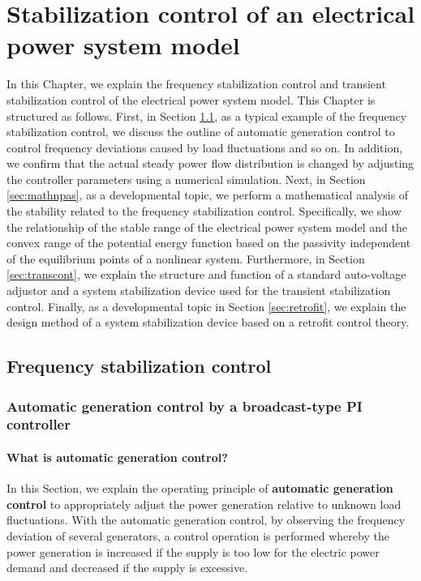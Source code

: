 \documentclass[tombow,dvipdfmx]{corona-a5-1.1}
\begin{document}
\chapter{Stabilization control of an electrical power system model}\label{ch:stabcont}

In this Chapter, we explain the frequency stabilization control and transient stabilization control of the electrical power system model.
This Chapter is structured as follows. First, in Section \ref{sec:agcover}, as a typical example of the frequency stabilization control, we discuss the outline of automatic generation control to control frequency deviations caused by load fluctuations and so on.
In addition, we confirm that the actual steady power flow distribution is changed by adjusting the controller parameters using a numerical simulation.
Next, in Section \ref{sec:mathnpas}, as a developmental topic, we perform a mathematical analysis of the stability related to the frequency stabilization control.
Specifically, we show the relationship of the stable range of the electrical power system model and the convex range of the potential energy function based on the passivity independent of the equilibrium points of a nonlinear system.
Furthermore, in Section \ref{sec:transcont}, we explain the structure and function of a standard auto-voltage adjustor and a system stabilization device used for the transient stabilization control.
Finally, as a developmental topic in Section \ref{sec:retrofit}, we explain the design method of a system stabilization device based on a retrofit control theory.


\section{Frequency stabilization control}\label{sec:agcover}
\subsection{Automatic generation control by a broadcast-type PI controller}\label{sec:broadPI}


\smallskip
\subsubsection{What is automatic generation control?}

In this Section, we explain the operating principle of \textbf{automatic generation control} to appropriately adjust the power generation relative to unknown load fluctuations.
With the automatic generation control, by observing the frequency deviation of several generators, a control operation is performed whereby the power generation is increased if the supply is too low for the electric power demand and decreased if the supply is excessive.
\end{document}
